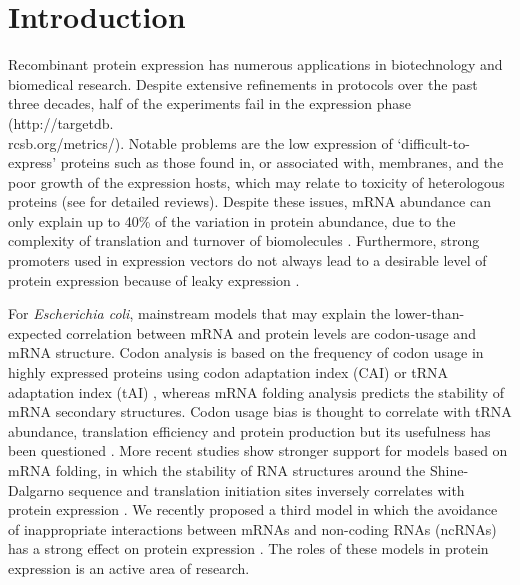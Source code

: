 \section{Introduction}
Recombinant protein expression has numerous applications in biotechnology and biomedical research. Despite extensive refinements in protocols over the past three decades, half of the experiments fail in the expression phase (http://targetdb.\\rcsb.org/metrics/). Notable problems are the low expression of ‘difficult-to-express’ proteins such as those found in, or associated with, membranes, and the poor growth of the expression hosts, which may relate to toxicity of heterologous proteins \cite{Kimelman2012-cu} (see \cite{Berlec2013-mb,Rosano2014-oq} for detailed reviews). Despite these issues, mRNA abundance can only explain up to 40\% of the variation in protein abundance, due to the complexity of translation and turnover of biomolecules \cite{Abreu2009-zf,Hanson2018-ge,Lim2018-rq,Stevens2013-hu,Schwanhausser2011-po,Bernstein2002-gg,Taniguchi2010-uq}. Furthermore, strong promoters used in expression vectors do not always lead to a desirable level of protein expression because of leaky expression \cite{Rosano2014-oq}.

For \textit{Escherichia coli}, mainstream models that may explain the lower-than-expected correlation between mRNA and protein levels are codon-usage and mRNA structure. Codon analysis is based on the frequency of codon usage in highly expressed proteins using codon adaptation index (CAI) \cite{Sharp1987-ed} or tRNA adaptation index (tAI) \cite{Reis2004-dl,Sabi2014-je}, whereas mRNA folding analysis predicts the stability of mRNA secondary structures. Codon usage bias is thought to correlate with tRNA abundance, translation efficiency and protein production \cite{Sharp1987-ed,Gutman1989-pn,Reis2004-dl,Sabi2014-je,Brule2017-mx,Osterman2020-vb,Verma2019-gh} but its usefulness has been questioned \cite{Kudla2009-tl,Plotkin2011-ak,Boel2016-jd,Cambray2018-kn}. More recent studies show stronger support for models based on mRNA folding, in which the stability of RNA structures around the Shine-Dalgarno sequence and translation initiation sites inversely correlates with protein expression \cite{De_Smit1990-xy,Kudla2009-tl,Plotkin2011-ak,Dvir2013-lq,Tuller2015-ts,Cambray2018-kn}. We recently proposed a third model in which the avoidance of inappropriate interactions between mRNAs and non-coding RNAs (ncRNAs) has a strong effect on protein expression \cite{Umu2016-zq}. The roles of these models in protein expression is an active area of research.

